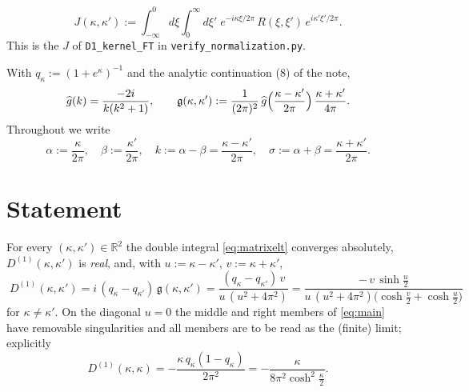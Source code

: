 \documentclass[11pt]{article}
\newcommand{\gfr}{\mathfrak g}\newcommand{\Dt}{\widetilde D^{(1)}}\newcommand{\psih}{\psi}
\begin{document}
\begin{definition}\label{def:J}
\begin{equation}\label{eq:Jdef}
 J(\kappa,\kappa'):=\int_{-\infty}^0\!\!d\xi\int_0^\infty\!\!d\xi'\;
 e^{-i\kappa\xi/2\pi}\,R(\xi,\xi')\,e^{i\kappa'\xi'/2\pi} .
\end{equation}
This is the \(J\) of \texttt{D1\_kernel\_FT} in \texttt{verify\_normalization.py}.
\end{definition}

\begin{definition}\label{def:rhs}
With \(q_\kappa:=(1+e^\kappa)^{-1}\) and the analytic continuation (8) of the note,
\begin{equation}\label{eq:ghat}
 \gh(k)=\frac{-2i}{k(k^2+1)},\qquad
 \gfr(\kappa,\kappa'):=\frac1{(2\pi)^2}\,\gh\Bigl(\frac{\kappa-\kappa'}{2\pi}\Bigr)\,\frac{\kappa+\kappa'}{4\pi}.
\end{equation}
Throughout we write
\begin{equation}\label{eq:vars}
 \alpha:=\frac{\kappa}{2\pi},\quad \beta:=\frac{\kappa'}{2\pi},\quad
 k:=\alpha-\beta=\frac{\kappa-\kappa'}{2\pi},\quad \sigma:=\alpha+\beta=\frac{\kappa+\kappa'}{2\pi}.
\end{equation}
\end{definition}

\section{Statement}\label{sec:statement}

\begin{theorem}[Kernel identity; = Lemma~5.1(ii) of the note]\label{thm:main}
For every \((\kappa,\kappa')\in\mathbb R^2\) the double integral \eqref{eq:matrixelt} converges
absolutely, \(D^{(1)}(\kappa,\kappa')\) is \emph{real}, and, with \(u:=\kappa-\kappa'\),
\(v:=\kappa+\kappa'\),
\begin{equation}\label{eq:main}
 \boxed{\;D^{(1)}(\kappa,\kappa')=i\,(q_\kappa-q_{\kappa'})\,\gfr(\kappa,\kappa')
 =\frac{(q_\kappa-q_{\kappa'})\,v}{u\,(u^2+4\pi^2)}
 =\frac{-\,v\,\sinh\frac u2}{u\,(u^2+4\pi^2)\bigl(\cosh\frac v2+\cosh\frac u2\bigr)}\;}
\end{equation}
for \(\kappa\neq\kappa'\).  On the diagonal \(u=0\) the middle and right members of \eqref{eq:main}
have removable singularities and all members are to be read as the (finite) limit; explicitly
\begin{equation}\label{eq:diag}
 D^{(1)}(\kappa,\kappa)=-\frac{\kappa\,q_\kappa(1-q_\kappa)}{2\pi^2}
 =-\frac{\kappa}{8\pi^2\cosh^2\frac\kappa2}.
\end{equation}
\end{theorem}
\end{document}
